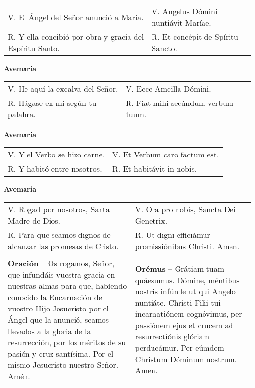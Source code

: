 \documentclass[11pt,a4paper]{book}
\begin{document}
    \begin{longtable} { p{} p{} }
        V. El Ángel del Señor anunció a María. & V. Angelus Dómini nuntiávit Maríae.\\
        R. Y ella concibió por obra y gracia del Espíritu Santo. & R. Et concépit de Spíritu Sancto.
    \end{longtable}

    \begin{center}
        \textbf{Avemaría}
    \end{center}

    \begin{longtable} { p{} p{} }
        V. He aquí la excalva del Señor. & V. Ecce Amcilla Dómini.\\
        R. Hágase en mi según tu palabra. & R. Fiat mihi secúndum verbum tuum.
    \end{longtable}

    \begin{center}
        \textbf{Avemaría}
    \end{center}

    \begin{longtable} { p{} p{} }
        V. Y el Verbo se hizo carne. & V. Et Verbum caro factum est.\\
        R. Y habitó entre nosotros. & R. Et habitávit in nobis.
    \end{longtable}

    \begin{center}
        \textbf{Avemaría}
    \end{center}

    \begin{longtable} { p{} p{} }
        V. Rogad por nosotros, Santa Madre de Dios. & V. Ora pro nobis, Sancta Dei Genetrix.\\
        R. Para que seamos dignos de alcanzar las promesas de Cristo. & R. Ut digni efficiámur promissiónibus Christi. Amen.\\\\
        \textbf{Oración} -- Os rogamos, Señor, que infundáis vuestra gracia en nuestras almas para que, 
        habiendo conocido la Encarnación de vuestro Hijo Jesucristo por el Ángel que la anunció, 
        seamos llevados a la gloria de la resurrección, por los méritos de su pasión y cruz santísima. 
        Por el mismo Jesucristo nuestro Señor. Amén. & 
        \textbf{Orémus} -- Grátiam tuam quáesumus. Dómine, méntibus nostris infúnde ut qui Angelo nuntiáte. 
        Christi Filii tui incarnatiónem cognóvimus, per passiónem ejus et crucem ad resurrectiónis glóriam perducámur. 
        Per eúmdem Christum Dóminum nostrum. Amen.
    \end{longtable}
\end{document}
